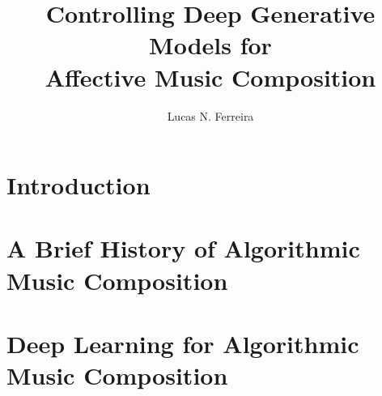 \documentclass[11pt]{ucscthesis}
\begin{document}

\title{Controlling Deep Generative Models for \\ Affective Music Composition}
\author{Lucas N. Ferreira}
\deanlinethree{}

\begin{frontmatter}

\maketitle
\copyrightpage

\tableofcontents
\listoffigures
\listoftables

\begin{abstract}

\end{abstract}

% 

% 

\end{frontmatter}


\chapter{Introduction}
\label{ch:intro}


\chapter{A Brief History of Algorithmic Music Composition}
\label{ch:amc}


\chapter{Deep Learning for Algorithmic Music Composition}
\label{ch:ml}

\end{document}

